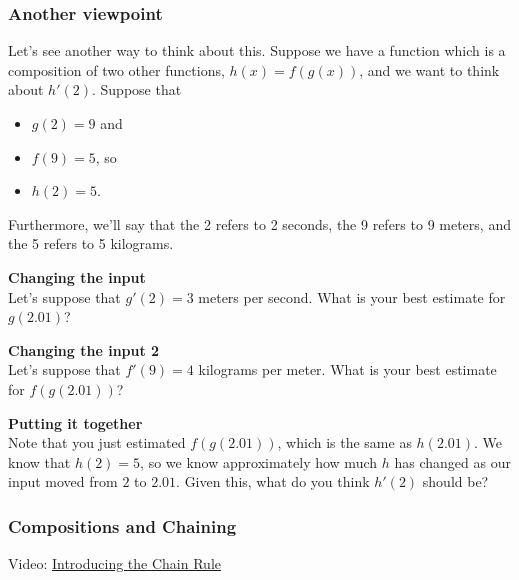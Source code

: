 \documentclass[pdftex, brazil, 12pt, twoside]{article}
\begin{document}
\subsubsection{Another viewpoint}
\label{u2-chain-rule-another-view}

Let's see another way to think about this. Suppose we have a function which is a
composition of two other functions, $h(x)=f(g(x))$, and we want to think about
$h'(2)$. Suppose that

\begin{itemize}[noitemsep]
\item $g(2) = 9$ and
\item $f(9) = 5$, so
\item $h(2) = 5$.
\end{itemize}

Furthermore, we'll say that the 2 refers to 2 seconds, the 9 refers to 9 meters,
and the 5 refers to 5 kilograms.

\begin{exercise}
  \textbf{Changing the input}\\%
  Let's suppose that $g'(2) = 3$ meters per second. What is your best estimate for
  $g(2.01)$?
\end{exercise}

\begin{exercise}
  \textbf{Changing the input 2}\\%
  Let's suppose that $f'(9) = 4$ kilograms per meter. What is your best estimate for
  $f(g(2.01))$?
\end{exercise}

\begin{exercise}
  \textbf{Putting it together}\\%
  Note that you just estimated $f(g(2.01))$, which is the same as $h(2.01)$. We
  know that $h(2) = 5$, so we know approximately how much $h$ has changed as our
  input moved from $2$ to $2.01$. Given this, what do you think $h'(2)$ should be?
\end{exercise}

\subsubsection{Compositions and Chaining}
\label{u2-chain-rule-compositions}

Video: \href{https://www.youtube.com/watch?v=FL1swgyrsus}{Introducing
  the Chain Rule}
\end{document}
